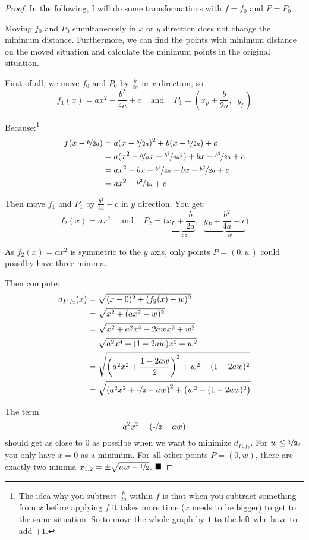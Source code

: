 \begin{proof}
In the following, I will do some transformations with $f = f_0$ and
$P = P_0$ .

Moving $f_0$ and $P_0$ simultaneously in $x$ or $y$ direction does 
not change the minimum distance. Furthermore, we can find the 
points with minimum distance on the moved situation and calculate
the minimum points in the original situation.

First of all, we move $f_0$ and $P_0$ by $\frac{b}{2a}$ in $x$ direction, so
\[f_1(x) = ax^2 - \frac{b^2}{4a} + c \;\;\;\text{ and }\;\;\; P_1 = \left (x_p+\frac{b}{2a},\;\; y_p \right )\]

Because:\footnote{The idea why you subtract $\frac{b}{2a}$ within
$f$ is that when you subtract something from $x$ before applying
$f$ it takes more time ($x$ needs to be bigger) to get to the same
situation. So to move the whole graph by $1$ to the left whe have
to add $+1$.}
\begin{align}
    f(x-\nicefrac{b}{2a}) &= a (x-\nicefrac{b}{2a})^2 + b (x-\nicefrac{b}{2a}) + c\\
    &= a (x^2 - \nicefrac{b}{a} x + \nicefrac{b^2}{4a^2}) + bx - \nicefrac{b^2}{2a} + c\\
    &= ax^2 - bx + \nicefrac{b^2}{4a} + bx - \nicefrac{b^2}{2a} + c\\
    &= ax^2 -\nicefrac{b^2}{4a} + c
\end{align}


Then move $f_1$ and $P_1$ by $\frac{b^2}{4a}-c$ in $y$ direction. You get:
\[f_2(x) = ax^2\;\;\;\text{ and }\;\;\; P_2 = \Big (\underbrace{x_P+\frac{b}{2a}}_{=: z},\;\; \underbrace{y_P+\frac{b^2}{4a}-c}_{=: w} \Big )\]

As $f_2(x) = ax^2$ is symmetric to the $y$ axis, only points 
$P = (0, w)$ could possilby have three minima.

Then compute:
\begin{align}
  d_{P,{f_2}}(x)  &= \sqrt{(x-0)^2 + (f_2(x)-w)^2}\\
    &= \sqrt{x^2 + (ax^2-w)^2}\\
    &= \sqrt{x^2 + a^2 x^4-2aw x^2+w^2}\\
    &= \sqrt{a^2 x^4 + (1-2aw) x^2 + w^2}\\
    &= \sqrt{\left (a^2 x^2 + \frac{1-2 a w}{2} \right )^2 + w^2 - (1-2 a w)^2}\\
    &= \sqrt{\left (a^2 x^2 + \nicefrac{1}{2}-a w \right )^2 + \big (w^2 - (1-2 a w)^2 \big)}
\end{align}

The term 
\[a^2 x^2 + (\nicefrac{1}{2}-a w)\]
should get as close to $0$ as possilbe when we want to minimize 
$d_{P,{f_2}}$. For $w \leq \nicefrac{1}{2a}$ you only have $x = 0$ as a minimum.
For all other points $P = (0, w)$, there are exactly two minima $x_{1,2} = \pm \sqrt{aw - \nicefrac{1}{2}}$.
$\qed$
\end{proof}

